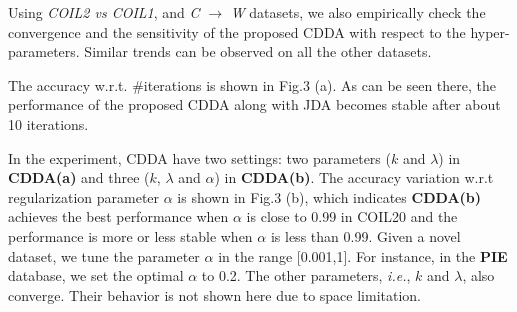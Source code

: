 \documentclass[10pt,twocolumn,letterpaper]{article}
\begin{document}
\begin{CJK*}{UTF8}{gkai}
		
		
		
		
		
		
		
	
	
Using  \emph{ COIL2 vs COIL1}, and \emph{C} $\rightarrow$ \emph{W} datasets, we also empirically check the convergence  and the sensitivity of the proposed CDDA  with respect to the hyper-parameters.  Similar trends can be observed on all the other datasets.
	
The accuracy w.r.t. $\#$iterations is shown in Fig.3 (a). As can be seen there, the performance of the proposed CDDA  along with JDA  becomes stable after about 10 iterations. 
	
In the experiment, CDDA have two settings: two parameters ($k$ and $\lambda$) in \textbf{CDDA(a)} and three ($k$, $\lambda$ and $\alpha$) in  \textbf{CDDA(b)}. The accuracy variation w.r.t regularization parameter $\alpha$ is shown in Fig.3 (b), which indicates \textbf{ CDDA(b)} achieves the best performance when $\alpha$ is close to 0.99 in COIL20 and the performance is more or less stable  when  $\alpha$ is less than 0.99. Given a novel dataset, we tune the parameter $\alpha$ in the range  [0.001,1]. 
	For instance, in the \textbf{PIE} database, we set the optimal $\alpha$  to 0.2. The other parameters, \textit{i.e.},  $k$ and $\lambda$, also converge.  Their behavior is not shown here  due to space limitation.
	

\end{CJK*}
\end{document}
